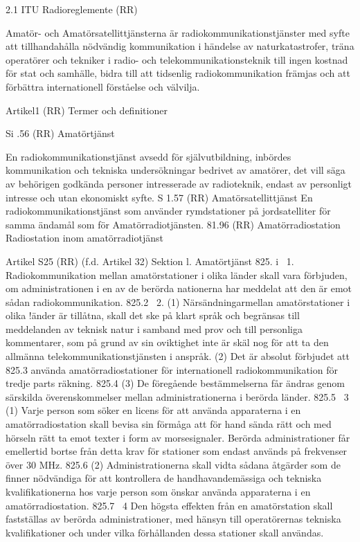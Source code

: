 \documentclass[a4paper,twoside,twocolumn,openright]{book}
\begin{document}
{{{{{2.1 ITU Radioreglemente (RR)

Amatör- och Amatörsatellittjänsterna är radiokommunikationstjänster med syfte att tillhandahålla nödvändig kommunikation i händelse av naturkatastrofer, träna operatörer
och tekniker i radio- och telekommunikationsteknik till ingen kostnad för stat och
samhälle, bidra till att tidsenlig radiokommunikation främjas och att förbättra internationell förståelse och välvilja.

Artikel1 (RR) Termer och definitioner

Si .56 (RR) Amatörtjänst

En radiokommunikationstjänst avsedd för
självutbildning, inbördes kommunikation och
tekniska undersökningar bedrivet av amatörer, det vill säga av behörigen godkända
personer intresserade av radioteknik, endast av personligt intresse och utan ekonomiskt syfte.
S 1.57 (RR) Amatörsatellittjänst
En radiokommunikationstjänst som använder rymdstationer på jordsatelliter för samma
ändamål som för Amatörradiotjänsten.
81.96 (RR) Amatörradiostation
Radiostation inom amatörradiotjänst

Artikel S25 (RR) (f.d. Artikel 32)
Sektion l. Amatörtjänst
825. i \  1. Radiokommunikation mellan
amatörstationer i olika länder skall vara förbjuden, om administrationen i en av de berörda nationerna har meddelat att den är
emot sådan radiokommunikation.
825.2 \  2. (1) Närsändningarmellan amatörstationer i olika !änder är tillåtna, skall det
ske på klart språk och begränsas till meddelanden av teknisk natur i samband med prov
och till personliga kommentarer, som på
grund av sin oviktighet inte är skäl nog för att
ta den allmänna telekommunikationstjänsten i anspråk.
(2) Det är absolut förbjudet att
825.3
använda amatörradiostationer för internationell radiokommunikation för tredje parts
räkning.
825.4
(3) De föregående bestämmelserna får ändras genom särskilda överenskommelser mellan administrationerna i berörda länder.
825.5 \ 3
(1) Varje person som söker en
licens för att använda apparaterna i en
amatörradiostation skall bevisa sin förmåga
att för hand sända rätt och med hörseln rätt
ta emot texter i form av morsesignaler. Berörda administrationer får emellertid bortse
från detta krav för stationer som endast
används på frekvenser över 30 MHz.
825.6
(2) Administrationerna skall vidta sådana åtgärder som de finner nödvändiga för att kontrollera de handhavandemässiga och tekniska kvalifikationerna hos varje
person som önskar använda apparaterna i
en amatörradiostation.
825.7 \ 4
Den högsta effekten från en
amatörstation skall fastställas av berörda
administrationer, med hänsyn till operatörernas tekniska kvalifikationer och under vilka förhållanden dessa stationer skall användas.

}}}}}
\end{document}
